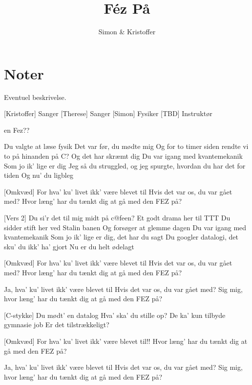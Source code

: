 \documentclass{article}
\title{Féz På}                   %
\author{Simon \& Kristoffer}  %
\begin{document}
                
\maketitle
\section*{Noter}                %
Eventuel beskrivelse.

\begin{roles}
[Kristoffer] Sanger
[Therese] Sanger
[Simon] Fysiker
[TBD] Instruktør
\end{roles}

\begin{props}
     en Fez??
\end{props}

\newpage%
\begin{song}
[Vers 1]
%
Du valgte at læse fysik
Det var før, du mødte mig
Og for to timer siden rendte vi to på hinanden på C?
Og det har skræmt dig
Du var igang med kvantemekanik
Som jo ik’ lige er dig
Jeg så du struggled, og jeg spurgte, hvordan du har det for tiden
Og nu' du ligbleg

[Omkvæd]
%
For hva' ku' livet ikk' være blevet til
Hvis det var os, du var gået med?
Hvor læng' har du tænkt dig at gå med den FEZ på?

[Vers 2]
%
Du si'r det til mig midt på c@feen?
Et godt drama her til TTT
Du sidder stift her ved Stalin banen
Og forsøger at glemme dagen
Du var igang med kvantemekanik
Som jo ik’ lige er dig, det har du sagt
Du googler datalogi, det sku' du ikk' ha' gjort
Nu er du helt ødelagt

[Omkvæd]
%
For hva' ku' livet ikk' være blevet til
Hvis det var os, du var gået med?
Hvor læng' har du tænkt dig at gå med den FEZ på?

Ja, hva' ku' livet ikk' være blevet til
Hvis det var os, du var gået med?
Sig mig, hvor læng' har du tænkt dig at gå med den FEZ på?

[C-stykke]
%
Du mødt' en datalog
Hva' ska' du stille op?
De ka' kun tilbyde gymnasie job
Er det tilstrækkeligt?

[Omkvæd]
%
For hva' ku' livet ikk' være blevet til!!
Hvor læng' har du tænkt dig at gå med den FEZ på?

Ja, hva' ku' livet ikk' være blevet til
Hvis det var os, du var gået med?
Sig mig, hvor læng' har du tænkt dig at gå med den FEZ på?
\end{song}
\end{document}
